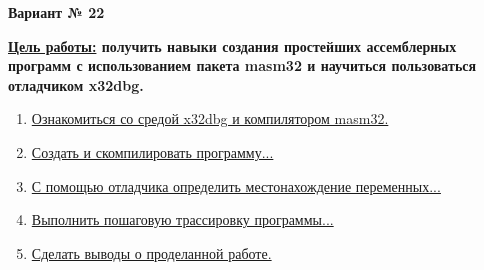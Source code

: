 \begin{center}
    {\large \textbf{Вариант № 22 \\}}
\end{center}

\textbf{\underline{Цель работы:} получить навыки создания простейших ассемблерных программ с использованием пакета masm32 и научиться пользоваться отладчиком x32dbg.}

\begin{enumerate}
    \item \hyperref[sec:1]{Ознакомиться со средой x32dbg и компилятором masm32.}
    \item \hyperref[sec:2]{Создать и скомпилировать программу...}
    \item \hyperref[sec:3]{С помощью отладчика определить местонахождение переменных...}
    \item \hyperref[sec:4]{Выполнить пошаговую трассировку программы...}
    \item \hyperref[sec:5]{Сделать выводы о проделанной работе.}
\end{enumerate}